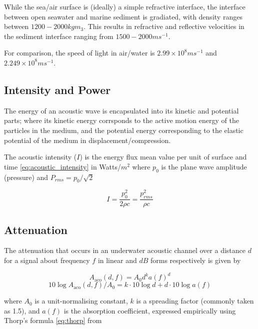  While the sea/air surface is (ideally) a simple refractive interface, the interface between open seawater and marine sediment is gradiated, with density ranges between $1200 - 2000 kg m_{3}$. 
 This results in refractive and reflective velocities in the sediment interface ranging from $1500-2000 ms^{-1}$.\cite{lurton2010} 

 For comparison, the speed of light in air/water is $2.99 \times 10^8 ms^{-1}$ and $2.249 \times 10^{8} ms^{-1}$.

 \subsection{Intensity and Power} 

 The energy of an acoustic wave is encapsulated into its kinetic and potential parts; where its kinetic energy corrsponds to the active motion energy of the particles in the medium, and the potential energy corresponding to the elastic potential of the medium in displacement/compression.

 The acoustic intensity ($I$) is the energy flux mean value per unit of surface and time \eqref{eq:acoustic_intensity} in Watts/$m^2$ where $p_0$ is the plane wave amplitude (pressure) and $P_{rms} = p_0/\sqrt{2}$

 \begin{equation}
  I = \frac{p_0^2}{2\rho c} = \frac{p_{rms}^2}{\rho c}
  \label{eq:acoustic_intensity}
 \end{equation}

 \subsection{Attenuation}

 The attenuation that occurs in an underwater acoustic channel over a distance $d$ for a signal about frequency $f$ in linear and $dB$ forms respectively is given by
 
 \begin{equation}
 \label{eq:acoattenuation}
 A_{\text{aco}}(d,f) = A_0d^ka(f)^d
 \end{equation}
 \begin{equation}
 \label{eq:acoattenuationdb}
 10 \log A_{\text{aco}}(d,f)/A_0 = k \cdot 10 \log d + d \cdot 10 \log a(f)
 \end{equation}
 
 where $A_0$ is a unit-normalising constant, $k$ is a spreading factor (commonly taken as 1.5), and $a(f)$ is the absorption coefficient, expressed empirically using Thorp's formula \eqref{eq:thorp} from \cite{Stojanovic2007}
 
